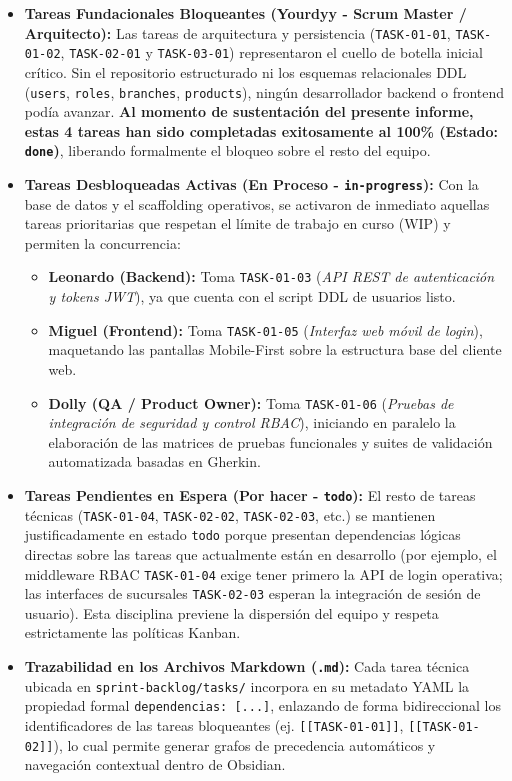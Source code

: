 \begin{itemize}
    \item \textbf{Tareas Fundacionales Bloqueantes (Yourdyy - Scrum Master / Arquitecto):} Las tareas de arquitectura y persistencia (\texttt{TASK-01-01}, \texttt{TASK-01-02}, \texttt{TASK-02-01} y \texttt{TASK-03-01}) representaron el cuello de botella inicial crítico. Sin el repositorio estructurado ni los esquemas relacionales DDL (\texttt{users}, \texttt{roles}, \texttt{branches}, \texttt{products}), ningún desarrollador backend o frontend podía avanzar. \textbf{Al momento de sustentación del presente informe, estas 4 tareas han sido completadas exitosamente al 100\% (Estado: \texttt{done})}, liberando formalmente el bloqueo sobre el resto del equipo.
    \item \textbf{Tareas Desbloqueadas Activas (En Proceso - \texttt{in-progress}):} Con la base de datos y el scaffolding operativos, se activaron de inmediato aquellas tareas prioritarias que respetan el límite de trabajo en curso (WIP) y permiten la concurrencia:
    \begin{itemize}
        \item \textbf{Leonardo (Backend):} Toma \texttt{TASK-01-03} (\textit{API REST de autenticación y tokens JWT}), ya que cuenta con el script DDL de usuarios listo.
        \item \textbf{Miguel (Frontend):} Toma \texttt{TASK-01-05} (\textit{Interfaz web móvil de login}), maquetando las pantallas Mobile-First sobre la estructura base del cliente web.
        \item \textbf{Dolly (QA / Product Owner):} Toma \texttt{TASK-01-06} (\textit{Pruebas de integración de seguridad y control RBAC}), iniciando en paralelo la elaboración de las matrices de pruebas funcionales y suites de validación automatizada basadas en Gherkin.
    \end{itemize}
    \item \textbf{Tareas Pendientes en Espera (Por hacer - \texttt{todo}):} El resto de tareas técnicas (\texttt{TASK-01-04}, \texttt{TASK-02-02}, \texttt{TASK-02-03}, etc.) se mantienen justificadamente en estado \texttt{todo} porque presentan dependencias lógicas directas sobre las tareas que actualmente están en desarrollo (por ejemplo, el middleware RBAC \texttt{TASK-01-04} exige tener primero la API de login operativa; las interfaces de sucursales \texttt{TASK-02-03} esperan la integración de sesión de usuario). Esta disciplina previene la dispersión del equipo y respeta estrictamente las políticas Kanban.
    \item \textbf{Trazabilidad en los Archivos Markdown (\texttt{.md}):} Cada tarea técnica ubicada en \texttt{sprint-backlog/tasks/} incorpora en su metadato YAML la propiedad formal \texttt{dependencias: [...]}, enlazando de forma bidireccional los identificadores de las tareas bloqueantes (ej. \texttt{[[TASK-01-01]]}, \texttt{[[TASK-01-02]]}), lo cual permite generar grafos de precedencia automáticos y navegación contextual dentro de Obsidian.
\end{itemize}

